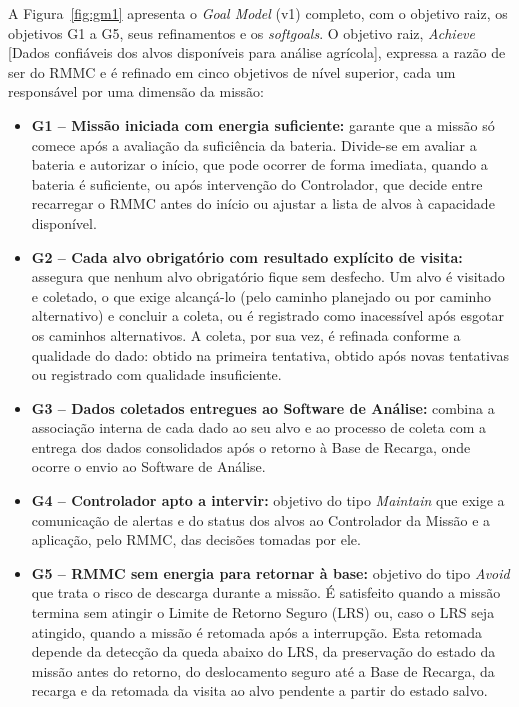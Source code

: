 \documentclass[a4paper, 12pt]{article}
\begin{document}
A Figura~\ref{fig:gm1} apresenta o \textit{Goal Model} (v1) completo, com o objetivo raiz, os objetivos G1 a G5, seus refinamentos e os \textit{softgoals}. O objetivo raiz, \textit{Achieve} [Dados confiáveis dos alvos disponíveis para análise agrícola], expressa a razão de ser do RMMC e é refinado em cinco objetivos de nível superior, cada um responsável por uma dimensão da missão:

\begin{itemize}
  \item \textbf{G1 -- Missão iniciada com energia suficiente:} garante que a missão só comece após a avaliação da suficiência da bateria. Divide-se em avaliar a bateria e autorizar o início, que pode ocorrer de forma imediata, quando a bateria é suficiente, ou após intervenção do Controlador, que decide entre recarregar o RMMC antes do início ou ajustar a lista de alvos à capacidade disponível.
  \item \textbf{G2 -- Cada alvo obrigatório com resultado explícito de visita:} assegura que nenhum alvo obrigatório fique sem desfecho. Um alvo é visitado e coletado, o que exige alcançá-lo (pelo caminho planejado ou por caminho alternativo) e concluir a coleta, ou é registrado como inacessível após esgotar os caminhos alternativos. A coleta, por sua vez, é refinada conforme a qualidade do dado: obtido na primeira tentativa, obtido após novas tentativas ou registrado com qualidade insuficiente.
  \item \textbf{G3 -- Dados coletados entregues ao Software de Análise:} combina a associação interna de cada dado ao seu alvo e ao processo de coleta com a entrega dos dados consolidados após o retorno à Base de Recarga, onde ocorre o envio ao Software de Análise.
  \item \textbf{G4 -- Controlador apto a intervir:} objetivo do tipo \textit{Maintain} que exige a comunicação de alertas e do status dos alvos ao Controlador da Missão e a aplicação, pelo RMMC, das decisões tomadas por ele.
  \item \textbf{G5 -- RMMC sem energia para retornar à base:} objetivo do tipo \textit{Avoid} que trata o risco de descarga durante a missão. É satisfeito quando a missão termina sem atingir o Limite de Retorno Seguro (LRS) ou, caso o LRS seja atingido, quando a missão é retomada após a interrupção. Esta retomada depende da detecção da queda abaixo do LRS, da preservação do estado da missão antes do retorno, do deslocamento seguro até a Base de Recarga, da recarga e da retomada da visita ao alvo pendente a partir do estado salvo.
\end{itemize}
\end{document}
